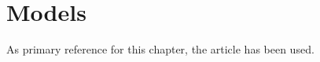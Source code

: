\chapter{Models}
\label{chapter:3rdchapter}
As primary reference for this chapter, the article \cite{boehm1988spiral} has been used.